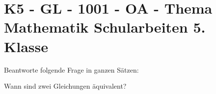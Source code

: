 \section{K5 - GL - 1001  - OA - Thema Mathematik Schularbeiten 5. Klasse}

\begin{beispiel}[K5 - GL]{1} %
Beantworte folgende Frage in ganzen Sätzen:

Wann sind zwei Gleichungen äquivalent?

\end{beispiel}